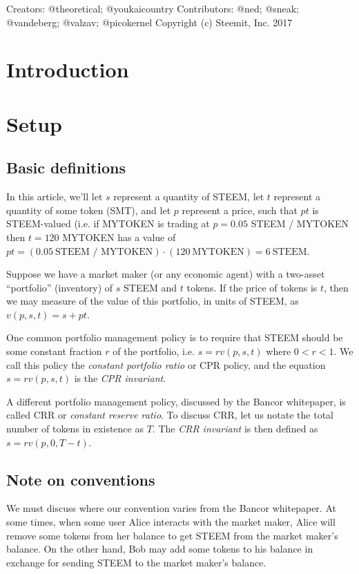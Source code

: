 \documentclass{article}
\begin{document}
Creators: @theoretical; @youkaicountry
Contributors: @ned; @sneak; @vandeberg; @valzav; @picokernel
Copyright (c) Steemit, Inc. 2017

\section{Introduction}

\section{Setup}

\subsection{Basic definitions}

In this article, we'll let $s$ represent a quantity of STEEM, let $t$
represent a quantity of some token (SMT), and let $p$ represent a price,
such that $pt$ is STEEM-valued (i.e. if MYTOKEN is trading at
$p = 0.05$ STEEM / MYTOKEN then $t = 120$ MYTOKEN has a value of
$pt = (0.05\ \mbox{STEEM / MYTOKEN}) \cdot (120\ \mbox{MYTOKEN}) = 6\ \mbox{STEEM}$.

Suppose we have a market maker (or any economic agent) with a two-asset
``portfolio'' (inventory) of $s$ STEEM and $t$ tokens.  If the price of
tokens is $t$, then we may measure of the value of this portfolio, in
units of STEEM, as $v(p, s, t) = s + pt$.

One common portfolio management policy is to require that STEEM
should be some constant fraction $r$ of the portfolio, i.e.
$s = r v(p, s, t)$ where $0 < r < 1$.  We call this policy the
\textit{constant portfolio ratio} or CPR policy, and the equation
$s = r v(p, s, t)$ is the \textit{CPR invariant}.

A different portfolio management policy, discussed by the Bancor
whitepaper, is called CRR or \textit{constant reserve ratio}.  To discuss CRR,
let us notate the total number of tokens in existence as $T$.  The
\textit{CRR invariant} is then defined as $s = r v(p, 0, T-t)$.

\subsection{Note on conventions}

We must discuss where our convention varies from the Bancor whitepaper.
At some times, when some user Alice interacts with the market maker,
Alice will remove some tokens from her balance to get STEEM from
the market maker's balance.  On the other hand, Bob may add some tokens
to his balance in exchange for sending STEEM to the market maker's balance.
\end{document}
